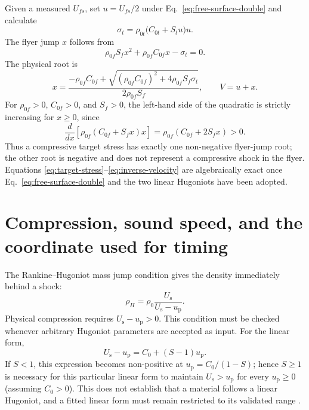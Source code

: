 \documentclass[11pt]{article}
\newcommand{\rhoz}[1][]{\rho_{0#1}}
\newcommand{\Us}[1][]{U_{\mathrm{s}#1}}
\newcommand{\up}[1][]{u_{\mathrm{p}#1}}
\newcommand{\sig}{\sigma}
\begin{document}
Given a measured $U_{fs}$, set $u=U_{fs}/2$ under
Eq.~\eqref{eq:free-surface-double} and calculate
\begin{equation}
  \sig_t=\rhoz[t]\bigl(C_{0t}+S_tu\bigr)u.
  \label{eq:target-stress}
\end{equation}
The flyer jump $x$ follows from
\begin{equation}
  \rhoz[f]S_f x^2+\rhoz[f]C_{0f}x-\sig_t=0.
\end{equation}
The physical root is
\begin{equation}
  x=
  \frac{-\rhoz[f]C_{0f}+
  \sqrt{(\rhoz[f]C_{0f})^2+4\rhoz[f]S_f\sig_t}}
  {2\rhoz[f]S_f},
  \qquad V=u+x.
  \label{eq:inverse-velocity}
\end{equation}
For $\rhoz[f]>0$, $C_{0f}>0$, and $S_f>0$, the left-hand side of the
quadratic is strictly increasing for $x\geq0$, since
\begin{equation}
  \frac{d}{dx}\left[\rhoz[f](C_{0f}+S_fx)x\right]
  =\rhoz[f](C_{0f}+2S_fx)>0.
\end{equation}
Thus a compressive target stress has exactly one non-negative flyer-jump root;
the other root is negative and does not represent a compressive shock in the
flyer.  Equations \eqref{eq:target-stress}--\eqref{eq:inverse-velocity} are
algebraically exact once Eq.~\eqref{eq:free-surface-double} and the two linear
Hugoniots have been adopted.

\section{Compression, sound speed, and the coordinate used for timing}
\label{sec:speed-coordinates}

The Rankine--Hugoniot mass jump condition gives the density immediately behind
a shock:
\begin{equation}
  \rho_H=\rhoz\frac{\Us}{\Us-\up}.
  \label{eq:shocked-density}
\end{equation}
Physical compression requires $\Us-\up>0$.  This condition must be checked
whenever arbitrary Hugoniot parameters are accepted as input.  For the linear
form,
\begin{equation}
  \Us-\up=C_0+(S-1)\up.
  \label{eq:compression-check-linear}
\end{equation}
If $S<1$, this expression becomes non-positive at
$\up=C_0/(1-S)$; hence $S\geq1$ is necessary for this particular linear form
to maintain $\Us>\up$ for every $\up\geq0$ (assuming $C_0>0$).  This does not
establish that a material follows a linear Hugoniot, and a fitted linear form
must remain restricted to its validated range \cite{Kerley2006}.
\end{document}
